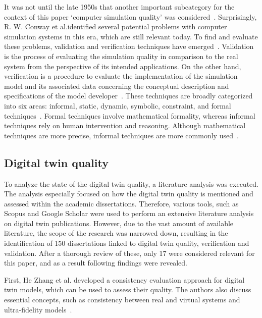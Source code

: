 \documentclass{llncs}
\begin{document}
    It was not until the late 1950s that another important subcategory for the context of this paper `computer simulation quality' 
    was considered~\cite{SomeProblemsofDigitalSystemsSimulation}. Surprisingly, R. W. Conway et al.identified several potential problems with computer simulation systems in this era, which are still relevant today.  
    To find and evaluate these problems, validation and verification techniques have emerged~\cite{StewartSimulation,VerificationValidationSergent,OsmanBalci}. 
    Validation is the process of evaluating the simulation quality in comparison to the real system from the perspective of its intended applications. 
    On the other hand, verification is a procedure to evaluate the implementation of the simulation model and its associated data concerning the conceptual description and specifications of 
    the model developer~\cite{StewartSimulation,VerificationValidationSergent}. These techniques are broadly categorized into six areas: informal, static, dynamic, symbolic, constraint, 
    and formal techniques~\cite{balcicategories,balcitechniques}. Formal techniques involve mathematical formality, 
    whereas informal techniques rely on human intervention and reasoning. Although mathematical techniques are more precise, informal techniques are more commonly used~\cite{balcicategories}.

    \subsection{Digital twin quality}
    To analyze the state of the digital twin quality, a literature analysis was executed. 
    The analysis especially focused on how the digital twin quality is mentioned and assessed within the academic dissertations. Therefore, various tools, such as Scopus and Google Scholar were 
    used to perform an extensive literature analysis on digital twin publications. However, due to the vast amount of available literature, the scope of the research was narrowed down, resulting in the identification of 
    150 dissertations linked to digital twin quality, verification and validation. After a thorough review of these, only 17 were considered relevant for this paper, and as a result following findings were revealed.
  
    First, He Zhang et al. developed a consistency evaluation approach for digital twin models, which can be used to assess their quality. 
    The authors also discuss essential concepts, such as consistency between real and virtual systems and ultra-fidelity models~\cite{ZHANGEVALUATIONMETHOD}. 
\end{document}
